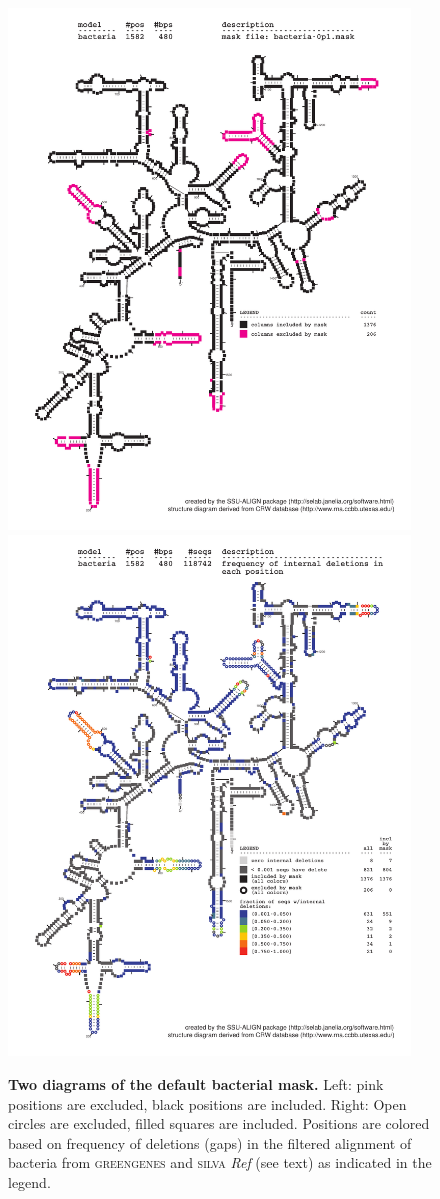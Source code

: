 \begin{figure}
  \begin{center}
\includegraphics[width=4.2in]{Figures/bacteria-0p1-mask}
\includegraphics[width=4.2in]{Figures/bacteria-ggsilR-dint-wmask}
  \end{center}
\caption{\textbf{Two diagrams of the default bacterial mask.} Left: pink positions are excluded,
  black positions are included. Right: Open circles are excluded,
  filled squares are included. Positions are colored based on
  frequency of deletions (gaps) in the filtered alignment of bacteria
  from \textsc{greengenes} and \textsc{silva} \emph{Ref} (see text) as
  indicated in the legend.}
\label{fig:mask-bac}
\end{figure}

